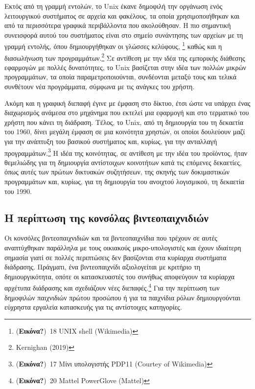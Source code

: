 \documentclass[
]{article}
\begin{document}
Εκτός από τη γραμμή εντολών, το Unix έκανε δημοφιλή την οργάνωση ενός
λειτουργικού συστήματος σε αρχεία και φακέλους, τα οποία
χρησιμοποιήθηκαν και από τα περισσότερα γραφικά περιβάλλοντα που
ακολούθησαν. Η πιο σημαντική συνεισφορά αυτού του συστήματος είναι στο
σημείο συνάντησης των αρχείων με τη γραμμή εντολής, όπου δημιουργήθηκαν
οι γλώσσες κελύφους, \footnote{(\textbf{Εικόνα?})~18 UNIX shell
  (Wikimedia)} καθώς και η διασωλήνωση των προγραμμάτων.\footnote{Kernighan
  (2019)} Σε αντίθεση με την ιδέα της εμπορικής διάθεσης εφαρμογών με
πολλές δυνατότητες, το Unix βασίζεται στην ιδέα των πολλών μικρών
προγραμμάτων, τα οποία παραμετροποιούνται, συνδέονται μεταξύ τους και
τελικά συνθέτουν νέα προγράμματα, σύμφωνα με τις ανάγκες του χρήστη.

Ακόμη και η γραφική διεπαφή έγινε με έμφαση στο δίκτυο, έτσι ώστε να
υπάρχει ένας διαχωρισμός ανάμεσα στο μηχάνημα που εκτελεί μια εφαρμογή
και στο τερματικό του χρήστη που κάνει τη διάδραση. Τέλος, το Unix, από
τη δημιουργία του τη δεκαετία του 1960, δίνει μεγάλη έμφαση σε μια
κοινότητα χρηστών, οι οποίοι δουλεύουν μαζί για την ανάπτυξη του βασικού
συστήματος και, κυρίως, για την ανταλλαγή προγραμμάτων.\footnote{(\textbf{Εικόνα?})~17
  Μίνι υπολογιστής PDP11 (Courtey of Wikimedia)} Η ιδέα της κοινότητας,
σε αντίθεση με την ιδέα του προϊόντος, ήταν θεμελιώδης για τη δημιουργία
αντίστοιχων κοινοτήτων κατά τις επόμενες δεκαετίες, όπως αυτές των
πρώτων δικτυακών συζητήσεων, της σκηνής των δοκιμαστικών προγραμμάτων
και, κυρίως, για τη δημιουργία του ανοιχτού λογισμικού, τη δεκαετία του
1990.

\hypertarget{ux3b7-ux3c0ux3b5ux3c1ux3afux3c0ux3c4ux3c9ux3c3ux3b7-ux3c4ux3b7ux3c2-ux3baux3bfux3bdux3c3ux3ccux3bbux3b1ux3c2-ux3b2ux3b9ux3bdux3c4ux3b5ux3bfux3c0ux3b1ux3b9ux3c7ux3bdux3b9ux3b4ux3b9ux3ceux3bd}{%
\subsection{Η περίπτωση της κονσόλας
βιντεοπαιχνιδιών}\label{ux3b7-ux3c0ux3b5ux3c1ux3afux3c0ux3c4ux3c9ux3c3ux3b7-ux3c4ux3b7ux3c2-ux3baux3bfux3bdux3c3ux3ccux3bbux3b1ux3c2-ux3b2ux3b9ux3bdux3c4ux3b5ux3bfux3c0ux3b1ux3b9ux3c7ux3bdux3b9ux3b4ux3b9ux3ceux3bd}}

Οι κονσόλες βιντεοπαιχνιδιών και τα βιντεοπαιχνίδια που τρέχουν σε αυτές
αναπτύχθηκαν παράλληλα με τους οικιακούς μικρο-υπολογιστές και έχουν
ιδιαίτερη σημασία γιατί σε πολλές περιπτώσεις δεν βασίζονται στα
κυρίαρχα συστήματα διάδρασης. Πράγματι, ένα βιντεοπαιχνίδι αξιολογείται
με κριτήριο τη δημιουργικότητα, οπότε οι κατασκευαστές του συνήθως
αποφεύγουν τα κυρίαρχα αρχέτυπα διάδρασης και σχεδιάζουν νέες
διεπαφές.\footnote{(\textbf{Εικόνα?})~20 Mattel PowerGlove (Mattel)} Για
την περίπτωση των δημοφιλών παιχνιδιών πρώτου προσώπου ή για τα
παιχνίδια ρόλων δημιουργούνται εύχρηστα εργαλεία κατασκευής για τις
αντίστοιχες κατηγορίες.
\end{document}
